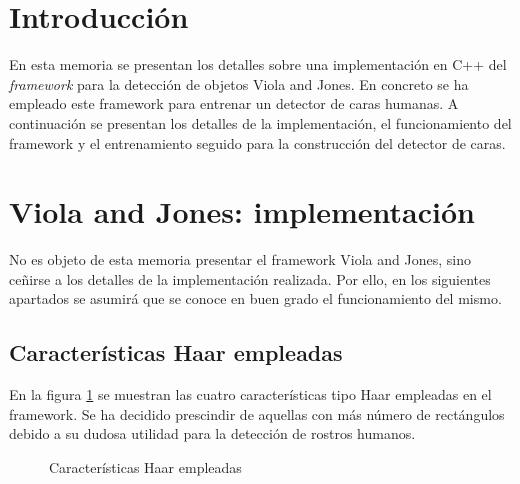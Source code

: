 \documentclass[11pt,spanish,a4paper]{article} %
\begin{document}

\tableofcontents %

\newpage %


\section{Introducción} %

En esta memoria se presentan los detalles sobre una implementación en C++ del \textit{framework} para la detección de objetos Viola and Jones. En concreto se ha empleado este framework para entrenar un detector de caras humanas. A continuación se presentan los detalles de la implementación, el funcionamiento del framework y el entrenamiento seguido para la construcción del detector de caras.


\section{Viola and Jones: implementación}

No es objeto de esta memoria presentar el framework Viola and Jones, sino ceñirse a los detalles de la implementación realizada. Por ello, en los siguientes apartados se asumirá que se conoce en buen grado el funcionamiento del mismo.

\subsection{Características Haar empleadas}

En la figura \ref{fig:features} se muestran las cuatro características tipo Haar empleadas en el framework. Se ha decidido prescindir de aquellas con más número de rectángulos debido a su dudosa utilidad para la detección de rostros humanos.

\begin{figure}[H]
\caption{Características Haar empleadas}
\label{fig:features}
\end{figure}
\end{document}
